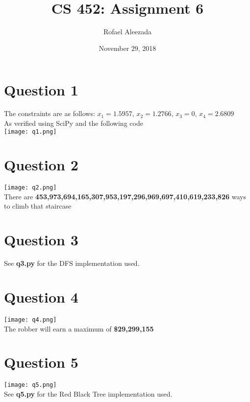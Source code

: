 \documentclass{article}
\title{CS 452: Assignment 6}
\date{November 29, 2018}
\author{Rofael Aleezada}
\begin{document}
	\maketitle
	
	\section{Question 1}
	\begin{center}
		The constraints are as follows: $x_1 = 1.5957$, $x_2 = 1.2766$, $x_3 = 0$, $x_4 = 2.6809$ \\
		As verified using SciPy and the following code \\
		\texttt{[image: q1.png]}
	\end{center}

	\section{Question 2}
	\begin{center}
		\texttt{[image: q2.png]} \\
		There are \textbf{453,973,694,165,307,953,197,296,969,697,410,619,233,826} ways to climb that staircase
	\end{center}

	\section{Question 3}
	\begin{center}
		See \textbf{q3.py} for the DFS implementation used.
	\end{center}

	\section{Question 4}
	\begin{center}
		\texttt{[image: q4.png]}\\
		The robber will earn a maximum of \textbf{\$29,299,155}
	\end{center}

	\section{Question 5}
	\begin{center}
		\texttt{[image: q5.png]}\\
		See \textbf{q5.py} for the Red Black Tree implementation used.
	\end{center}
	
	
	
\end{document}

